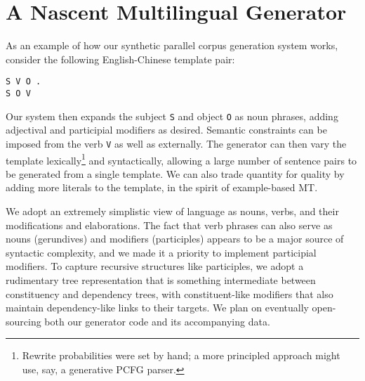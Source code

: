 \section{A Nascent Multilingual Generator}
\label{sec:generator}


As an example of how our synthetic parallel corpus generation system works, consider the following English-Chinese template pair:

\begin{center} \begin{small} 
{\tt S V O .} \\
{\tt S  O V }
\end{small} \end{center} 

\noindent Our system then expands the subject {\small \tt S} and object {\small \tt O} as noun phrases, adding adjectival and participial modifiers as desired. 
Semantic constraints can be imposed from the verb {\small \tt V} as well as externally.
The generator can then vary the template lexically\footnote{Rewrite probabilities were set by hand; a more principled approach might use, say, a generative PCFG parser.} and syntactically, allowing a large number of sentence pairs to be generated from a single template.
We can also trade quantity for quality by adding more literals to the template, in the spirit of example-based MT.

We adopt an extremely simplistic view of language as nouns, verbs, and their modifications and elaborations.
The fact that verb phrases can also serve as nouns (gerundives) and modifiers (participles) appears to be a major source of syntactic complexity, and we made it a priority to implement participial modifiers.
To capture recursive structures like participles, we adopt a rudimentary tree representation that is something intermediate between constituency and dependency trees, with constituent-like modifiers that also maintain dependency-like links to their targets.
We plan on eventually open-sourcing both our generator code and its accompanying data.

